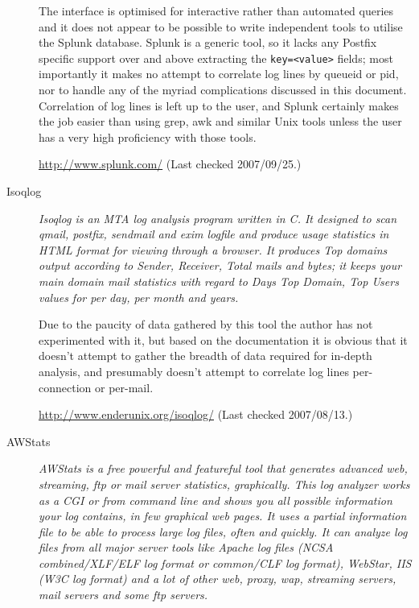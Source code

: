 \documentclass[a4paper,12pt,draft]{article}
\begin{document}
\begin{description}
        The interface is optimised for interactive rather than automated
        queries and it does not appear to be possible to write independent
        tools to utilise the Splunk database.  Splunk is a generic tool, so
        it lacks any Postfix specific support over and above extracting the
        \texttt{key=<value>} fields; most importantly it makes no attempt
        to correlate log lines by queueid or pid, nor to handle any of the
        myriad complications discussed in this document.  Correlation of
        log lines is left up to the user, and Splunk certainly makes the
        job easier than using grep, awk and similar Unix tools unless the
        user has a very high proficiency with those tools.

        \url{http://www.splunk.com/} \newline (Last checked 2007/09/25.)

    \item [Isoqlog] \textit{Isoqlog is an MTA log analysis program written
        in C. It designed to scan qmail, postfix, sendmail and exim logfile
        and produce usage statistics in HTML format for viewing through a
        browser. It produces Top domains output according to Sender,
        Receiver, Total mails and bytes; it keeps your main domain mail
        statistics with regard to Days Top Domain, Top Users values for per
        day, per month and years.\/}

        Due to the paucity of data gathered by this tool the author has not
        experimented with it, but based on the documentation it is obvious
        that it doesn't attempt to gather the breadth of data required for
        in-depth analysis, and presumably doesn't attempt to correlate log
        lines per-connection or per-mail.

        \url{http://www.enderunix.org/isoqlog/} \newline (Last checked
        2007/08/13.)

    \item [AWStats] \textit{AWStats is a free powerful and featureful tool
        that generates advanced web, streaming, ftp or mail server
        statistics, graphically. This log analyzer works as a CGI or from
        command line and shows you all possible information your log
        contains, in few graphical web pages. It uses a partial information
        file to be able to process large log files, often and quickly. It
        can analyze log files from all major server tools like Apache log
        files (NCSA combined/XLF/ELF log format or common/CLF log format),
        WebStar, IIS (W3C log format) and a lot of other web, proxy, wap,
        streaming servers, mail servers and some ftp servers.\/}
        

\end{description}
\end{document}
